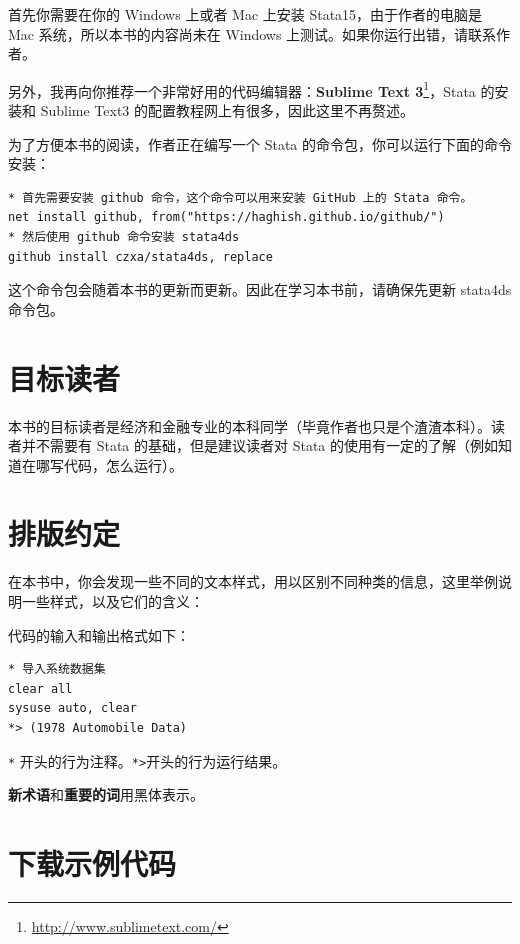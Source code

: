 \documentclass[]{ctexbook}
\renewcommand{\href}[2]{#2\footnote{\url{#1}}}
\begin{document}
首先你需要在你的 Windows 上或者 Mac 上安装 Stata15，由于作者的电脑是 Mac 系统，所以本书的内容尚未在 Windows 上测试。如果你运行出错，请联系作者。

另外，我再向你推荐一个非常好用的代码编辑器：\href{http://www.sublimetext.com/}{\textbf{Sublime Text 3}}，Stata 的安装和 Sublime Text3 的配置教程网上有很多，因此这里不再赘述。

为了方便本书的阅读，作者正在编写一个 Stata 的命令包，你可以运行下面的命令安装：

\begin{lstlisting}
* 首先需要安装 github 命令，这个命令可以用来安装 GitHub 上的 Stata 命令。
net install github, from("https://haghish.github.io/github/")
* 然后使用 github 命令安装 stata4ds
github install czxa/stata4ds, replace
\end{lstlisting}

这个命令包会随着本书的更新而更新。因此在学习本书前，请确保先更新 stata4ds 命令包。

\hypertarget{section-3}{%
\section{目标读者}\label{section-3}}

本书的目标读者是经济和金融专业的本科同学（毕竟作者也只是个渣渣本科）。读者并不需要有 Stata 的基础，但是建议读者对 Stata 的使用有一定的了解（例如知道在哪写代码，怎么运行）。

\hypertarget{section-4}{%
\section{排版约定}\label{section-4}}

在本书中，你会发现一些不同的文本样式，用以区别不同种类的信息，这里举例说明一些样式，以及它们的含义：

代码的输入和输出格式如下：

\begin{lstlisting}
* 导入系统数据集
clear all
sysuse auto, clear
*> (1978 Automobile Data)
\end{lstlisting}

\texttt{*} 开头的行为注释。\texttt{*\textgreater{}}开头的行为运行结果。

\textbf{新术语}和\textbf{重要的词}用黑体表示。

\hypertarget{section-5}{%
\section{下载示例代码}\label{section-5}}
\end{document}
